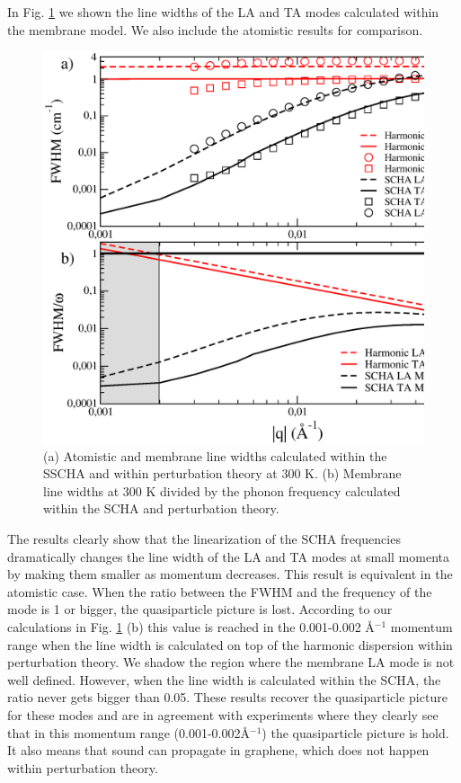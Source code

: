 In Fig. \ref{lw-membrane} we shown the line widths of the LA and TA modes calculated within the membrane model. We 
also include the atomistic results for comparison.
\begin{figure}[ht]
\includegraphics[width=0.8\linewidth]{Figures/lwmembrane.eps}
	\caption[Atomistic and membrane line widths calculated within the SSCHA and within perturbation theory in 
	graphene]{(a) Atomistic and membrane line widths calculated within the SSCHA and within perturbation theory 
	at 300 K. (b) Membrane line widths at 300 K divided by the phonon frequency calculated within the SCHA and 
	perturbation theory.}
\label{lw-membrane}
\end{figure}
The results clearly show that the linearization of the SCHA frequencies dramatically changes the line width of the LA 
and TA modes at small momenta by making them smaller as momentum decreases. This result is equivalent in the 
atomistic case. When the ratio between the FWHM and the frequency of the mode is 1 or bigger, the quasiparticle 
picture is lost. According to our calculations in Fig. \ref{lw-membrane} (b) this value is reached in the 0.001-0.002 
\AA$^{-1}$ momentum range when the line width is calculated on top of the harmonic dispersion within perturbation 
theory. We shadow the region where the membrane LA mode is not well defined. However, when the line width is 
calculated within the SCHA, the ratio never gets bigger than 0.05. These results recover the quasiparticle picture 
for these modes and are in agreement with experiments\cite{wang2008brillouin} where they clearly see that in this 
momentum range (0.001-0.002\AA$^{-1}$) the quasiparticle picture is hold. It also means that sound can propagate in 
graphene, which does not happen within perturbation theory. \\

